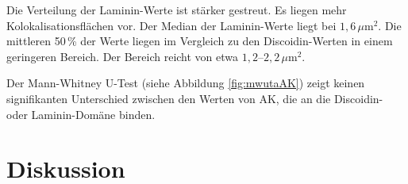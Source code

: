 \documentclass[a4paper, 12pt]{scrreprt}
\begin{document}
	Die Verteilung der Laminin-Werte ist stärker gestreut. Es liegen mehr
	Kolokalisationsflächen vor. Der Median der Laminin-Werte liegt bei
	$1{,}6\,\mu\text{m}^2$. Die mittleren 50\,\% der Werte liegen im
	Vergleich zu den Discoidin-Werten in einem geringeren Bereich. Der
	Bereich reicht von etwa $1{,}2$--$2{,}2\,\mu\text{m}^2$.
	
	Der Mann-Whitney U-Test (siehe Abbildung \ref{fig:mwutaAK}) zeigt keinen signifikanten
	Unterschied zwischen den Werten von AK, die an die Discoidin- oder
	Laminin-Domäne binden.
\clearpage
%
%
%
%
\chapter{Diskussion}
\end{document}
